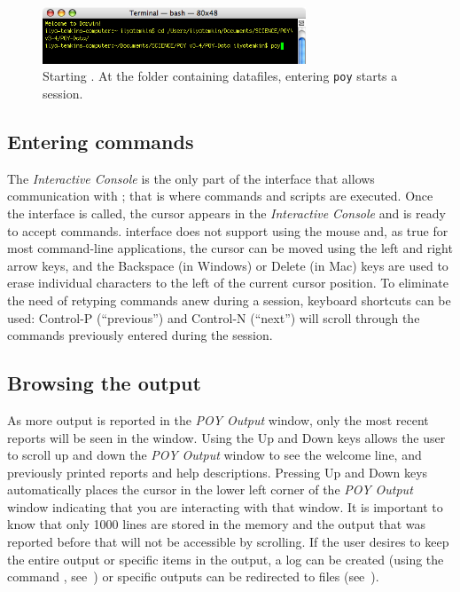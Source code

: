 \begin{figure}[htbp]
   \centering
   \includegraphics[width=0.7\textwidth]{figures/figprelim2.jpg}
   \caption{Starting \poy. At the folder containing datafiles, entering \texttt{poy} starts a \poy session.}
   \label{fig:figprelim2}
\end{figure}

\subsection{Entering commands}
The \emph{Interactive Console} is the only part of the interface that allows communication with \poy; that is where commands and scripts are executed. Once the \poy interface is called, the cursor appears in the \emph{Interactive Console} and \poy is ready to accept commands. \poy interface does not support using the mouse and, as true for most command-line applications, the cursor can be moved using the left and right arrow keys, and the Backspace (in Windows) or Delete (in Mac) keys are used to erase individual characters to the left of the current cursor position. To eliminate the need of retyping commands anew during a \poy session, keyboard shortcuts can be used: Control-P (``previous'') and Control-N (``next'') will scroll through the commands previously entered during the session.

\subsection{Browsing the output}
As more output is reported in the \emph{POY Output} window, only the most recent reports will be seen in the window. Using the Up and Down keys allows the user to scroll up and down the \emph{POY Output} window to see the welcome line, and previously printed reports and help descriptions. Pressing Up and Down keys automatically places the cursor in the lower left corner of the \emph{POY Output} window indicating that you are interacting with that window. It is important to know that only 1000 lines are stored in the memory and the output that was reported before that will not be accessible by scrolling. If the user desires to keep the entire output or specific items in the output, a log can be created (using the command , see~) or specific outputs can be redirected to files (see~).

